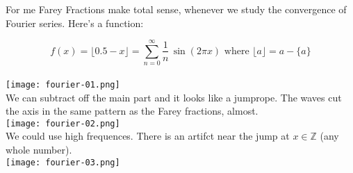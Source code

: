 \documentclass[12pt]{article}
\begin{document}
\newpage

\noindent For me Farey Fractions make total sense, whenever we study the convergence of Fourier series.  Here's a function:

$$ f(x) = 
\big\lfloor 0.5 - x \big\rfloor = \sum_{n= 0 }^\infty \frac{1}{n} \,\sin (2\pi x) \text{ where } \lfloor a \rfloor = a - \{ a \} $$
\\
\texttt{[image: fourier-01.png]} \\
We can subtract off the main part and it looks like a jumprope.  The waves cut the axis in the same pattern as the Farey fractions, almost. \\
\texttt{[image: fourier-02.png]} \\
We could use high frequences. There is an artifct near the jump at $x \in \mathbb{Z}$ (any whole number).\\
\texttt{[image: fourier-03.png]} 

\newpage 

\selectfont \fontsize{12.5}{15}\selectfont
\end{document}
